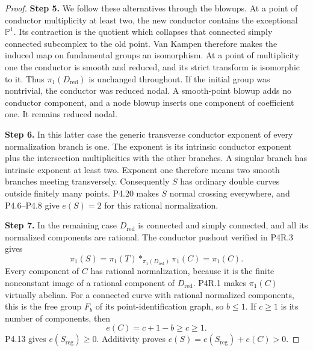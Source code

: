 \begin{proof}
\noindent\textbf{Step 5.} We follow these alternatives through the blowups. At a
point of conductor multiplicity at least two, the new
conductor contains the exceptional $\mathbb P^1$.
Its contraction is the quotient which collapses that
connected simply connected subcomplex to the old
point. Van Kampen therefore makes the induced map on
fundamental groups an isomorphism. At a point of
multiplicity one the conductor is smooth and reduced,
and its strict transform is isomorphic to it. Thus
$\pi_1(D_{\mathrm{red}})$ is unchanged throughout.
If the initial group was nontrivial, the conductor was
reduced nodal. A smooth-point blowup adds no conductor
component, and a node blowup inserts one component of
coefficient one. It remains reduced nodal.

\noindent\textbf{Step 6.} In this latter case the generic transverse conductor
exponent of every normalization branch is one. The
exponent is its intrinsic conductor exponent plus the
intersection multiplicities with the other branches.
A singular branch has intrinsic exponent at least two.
Exponent one therefore means two smooth branches
meeting transversely. Consequently $S$ has ordinary
double curves outside finitely many points. P4.20 makes
$S$ normal crossing everywhere, and P4.6--P4.8 give
$e(S)=2$ for this rational normalization.

\noindent\textbf{Step 7.} In the remaining case $D_{\mathrm{red}}$ is connected
and simply connected, and all its normalized components
are rational. The conductor pushout verified in P4R.3
gives
\[
 \pi_1(S)=\pi_1(T)*_{\pi_1(D_{\mathrm{red}})}\pi_1(C)
          =\pi_1(C).
\]
Every component of $C$ has rational normalization,
because it is the finite nonconstant image of a
rational component of $D_{\mathrm{red}}$. P4R.1 makes
$\pi_1(C)$ virtually abelian. For a connected curve
with rational normalized components, this is the free
group $F_b$ of its point-identification graph, so
$b\le1$. If $c\ge1$ is its number of components, then
\[
 e(C)=c+1-b\ge c\ge1.
\]
P4.13 gives $e(S_{\mathrm{reg}})\ge0$. Additivity proves
$e(S)=e(S_{\mathrm{reg}})+e(C)>0$.
\end{proof}

